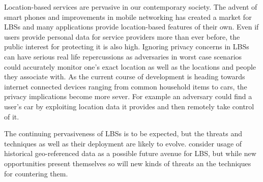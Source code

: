 \documentclass[english]{tktltiki2}
\theoremstyle{definition}
\theoremstyle{remark}
\begin{document}
Location-based services are pervasive in our contemporary society. The advent of smart phones and improvements in mobile networking has created a market for LBSs and many applications provide location-based features of their own. Even if users provide personal data for service providers more than ever before, the public interest for protecting it is also high. Ignoring privacy concerns in LBSs can have serious real life repercussions as adversaries in worst case scenarios could accurately monitor one's exact location as well as the locations and people they associate with. As the current course of development is heading towards internet connected devices ranging from common household items to cars, the privacy implications become more sever. For example an adversary could find a user's car by exploiting location data it provides and then remotely take control of it. \par
The continuing pervasiveness of LBSs is to be expected, but the threats and techniques as well as their deployment are likely to evolve. \cite{LocationPrivacy} consider usage of historical geo-referenced data as a possible future avenue for LBS, but while new opportunities present themselves so will new kinds of threats an the techniques for countering them.

%
%
% 
%







% 
\end{document}
